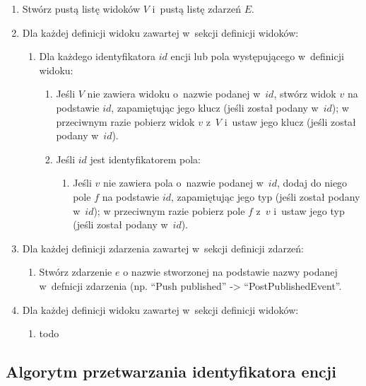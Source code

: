 \begin{enumerate}
 \item Stwórz pustą listę widoków $V$ i~pustą listę zdarzeń $E$.
 \item Dla każdej definicji widoku zawartej w~sekcji definicji widoków:
  \begin{enumerate}
   \item Dla każdego identyfikatora $id$ encji lub pola występującego w~definicji widoku:
    \begin{enumerate}
     \item Jeśli $V$ nie zawiera widoku o~nazwie podanej w~$id$, stwórz widok $v$ na podstawie $id$, zapamiętując jego klucz (jeśli został podany w~$id$); w przeciwnym razie pobierz widok $v$ z~$V$ i~ustaw jego klucz (jeśli został podany w~$id$).
     \item Jeśli $id$ jest identyfikatorem pola:
      \begin{enumerate}
       \item Jeśli $v$ nie zawiera pola o~nazwie podanej w~$id$, dodaj do niego pole $f$ na podstawie $id$, zapamiętując jego typ (jeśli został podany w~$id$); w przeciwnym razie pobierz pole $f$ z~$v$ i~ustaw jego typ (jeśli został podany w~$id$).
      \end{enumerate}

    \end{enumerate}
  \end{enumerate}

 \item Dla każdej definicji zdarzenia zawartej w~sekcji definicji zdarzeń:
  \begin{enumerate}
   \item Stwórz zdarzenie $e$ o nazwie stworzonej na podstawie nazwy podanej w~defnicji zdarzenia (np. ``Push published'' -> ``PostPublishedEvent''.

  \end{enumerate}
 \item Dla każdej definicji widoku zawartej w~sekcji definicji widoków:
  \begin{enumerate}
   \item todo
  \end{enumerate}

\end{enumerate}


\subsection{Algorytm przetwarzania identyfikatora encji}


